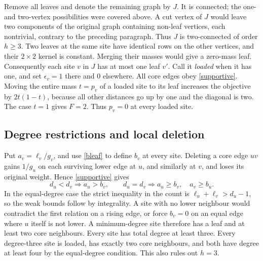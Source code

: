 \documentclass[11pt,a4paper]{article}
\theoremstyle{remark}\newtheorem*{remark}{Remark}
\begin{document}
Remove all leaves and denote the remaining graph by $J$. It is connected; the one- and two-vertex possibilities were covered above. A cut vertex of $J$ would leave two components of the original graph containing non-leaf vertices, each nontrivial, contrary to the preceding paragraph. Thus $J$ is two-connected of order $h\ge3$. Two leaves at the same site have identical rows on the other vertices, and their $2\times2$ kernel is constant. Merging their masses would give a zero-mass leaf. Consequently each site $v$ in $J$ has at most one leaf $v'$. Call it \emph{loaded} when it has one, and set $\epsilon_v=1$ there and $0$ elsewhere. All core edges obey \eqref{supportive}. Moving the entire mass $t=p_v$ of a loaded site to its leaf increases the objective by $2t(1-t)$, because all other distances go up by one and the diagonal is two. The case $t=1$ gives $F=2$. Thus $p_v=0$ at every loaded site.
\subsection{Degree restrictions and local deletion}
Put $a_v=\ell_v/g_v$, and use \eqref{bleaf} to define $b_v$ at every site. Deleting a core edge $uv$ gains $1/g_u$ on each surviving lower edge at $u$, and similarly at $v$, and loses its original weight. Hence \eqref{supportive} gives
\[
 d_u<d_v\Longrightarrow a_u>b_v,\qquad
 d_u=d_v\Longrightarrow a_u\ge b_v,\quad a_v\ge b_u .
\]
In the equal-degree case the strict inequality in the count is $\ell_u+\ell_v>d_u-1$, so the weak bounds follow by integrality. A site with no lower neighbour would contradict the first relation on a rising edge, or force $b_v=0$ on an equal edge where $u$ itself is not lower. A minimum-degree site therefore has a leaf and at least two core neighbours. Every site has total degree at least three. Every degree-three site is loaded, has exactly two core neighbours, and both have degree at least four by the equal-degree condition. This also rules out $h=3$.
\end{document}
